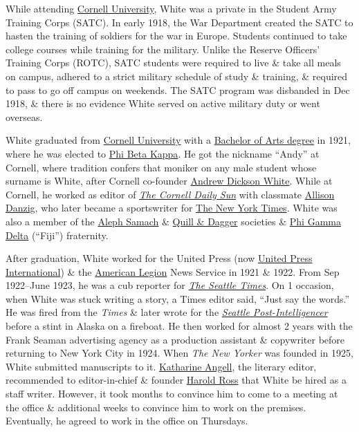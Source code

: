 \documentclass[oneside]{book}
\numberwithin{equation}{section}
\begin{document}
While attending \href{https://en.wikipedia.org/wiki/Cornell_University}{Cornell University}, White was a private in the Student Army Training Corps (SATC). In early 1918, the War Department created the SATC to hasten the training of soldiers for the war in Europe. Students continued to take college courses while training for the military. Unlike the Reserve Officers' Training Corps (ROTC), SATC students were required to live \& take all meals on campus, adhered to a strict military schedule of study \& training, \& required to pass to go off campus on weekends. The SATC program was disbanded in Dec 1918, \& there is no evidence White served on active military duty or went overseas.

White graduated from \href{https://en.wikipedia.org/wiki/Cornell_University}{Cornell University} with a \href{https://en.wikipedia.org/wiki/Bachelor_of_Arts_degree}{Bachelor of Arts degree} in 1921, where he was elected to \href{https://en.wikipedia.org/wiki/Phi_Beta_Kappa}{Phi Beta Kappa}. He got the nickname ``Andy'' at Cornell, where tradition confers that moniker on any male student whose surname is White, after Cornell co-founder \href{https://en.wikipedia.org/wiki/Andrew_Dickson_White}{Andrew Dickson White}. While at Cornell, he worked as editor of \href{https://en.wikipedia.org/wiki/The_Cornell_Daily_Sun}{\textit{The Cornell Daily Sun}} with classmate \href{https://en.wikipedia.org/wiki/Allison_Danzig}{Allison Danzig}, who later became a sportswriter for \href{https://en.wikipedia.org/wiki/The_New_York_Times}{The New York Times}. White was also a member of the \href{https://en.wikipedia.org/wiki/Aleph_Samach}{Aleph Samach} \& \href{https://en.wikipedia.org/wiki/Quill_and_Dagger}{Quill \& Dagger} societies \& \href{https://en.wikipedia.org/wiki/Phi_Gamma_Delta}{Phi Gamma Delta} (``Fiji'') fraternity.

After graduation, White worked for the United Press (now \href{https://en.wikipedia.org/wiki/United_Press_International}{United Press International}) \& the \href{https://en.wikipedia.org/wiki/American_Legion}{American Legion} News Service in 1921 \& 1922. From Sep 1922--June 1923, he was a cub reporter for \href{https://en.wikipedia.org/wiki/The_Seattle_Times}{\textit{The Seattle Times}}. On 1 occasion, when White was stuck writing a story, a Times editor said, ``Just say the words.'' He was fired from the \textit{Times} \& later wrote for the \href{https://en.wikipedia.org/wiki/Seattle_Post-Intelligencer}{\textit{Seattle Post-Intelligencer}} before a stint in Alaska on a fireboat. He then worked for almost 2 years with the Frank Seaman advertising agency as a production assistant \& copywriter before returning to New York City in 1924. When \textit{The New Yorker} was founded in 1925, White submitted manuscripts to it. \href{https://en.wikipedia.org/wiki/Katharine_Sergeant_Angell_White}{Katharine Angell}, the literary editor, recommended to editor-in-chief \& founder \href{https://en.wikipedia.org/wiki/Harold_Ross}{Harold Ross} that White be hired as a staff writer. However, it took months to convince him to come to a meeting at the office \& additional weeks to convince him to work on the premises. Eventually, he agreed to work in the office on Thursdays.
\end{document}
